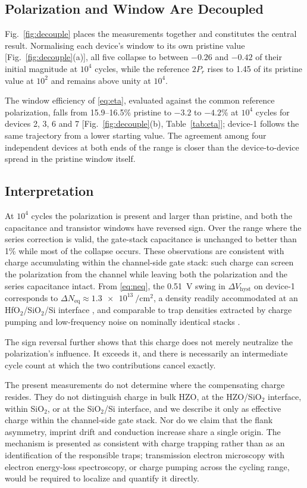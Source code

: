 \documentclass[journal]{IEEEtran}
\newcommand{\rev}[1]{#1}                    %
\newcommand{\Prem}{P_r}
\newcommand{\Neq}{N_{\mathrm{eq}}}
\newcommand{\dVh}{\Delta V_{\mathrm{hyst}}}
\begin{document}
\subsection{Polarization and Window Are Decoupled}
\rev{Fig.~\ref{fig:decouple} places the measurements together and
constitutes the central result. Normalising each device's window to its
own pristine value [Fig.~\ref{fig:decouple}(a)], all five collapse to
between $-0.26$ and $-0.42$ of their initial magnitude at $10^4$ cycles,
while the reference $2\Prem$ rises to 1.45 of its pristine value at
$10^2$ and remains above unity at $10^4$.

The window efficiency of \eqref{eq:eta}, evaluated against the common
reference polarization, falls from 15.9--16.5\% pristine to $-3.2$ to
$-4.2$\% at $10^4$ cycles for devices 2, 3, 6 and 7
[Fig.~\ref{fig:decouple}(b), Table~\ref{tab:eta}]; device-1 follows the
same trajectory from a lower starting value. The agreement among four
independent devices at both ends of the range is closer than the
device-to-device spread in the pristine window itself.}

\subsection{Interpretation}
\rev{At $10^4$ cycles the polarization is present and larger than
pristine, and both the capacitance and transistor windows have reversed
sign. Over the range where the series correction is valid, the
gate-stack capacitance is unchanged to better than 1\% while most of the
collapse occurs. These observations are consistent with charge
accumulating within the channel-side gate stack: such charge can screen
the polarization from the channel while leaving both the polarization
and the series capacitance intact.} From \eqref{eq:neq}, the
\SI{0.51}{\volt} swing in $\dVh$ on device-1 corresponds to
$\Delta\Neq\approx\SI{1.3e13}{\per\centi\meter\squared}$, a density
readily accommodated at an HfO$_2$/SiO$_2$/Si interface
\cite{Ref_DD_1,Toprasertpong}, and comparable to trap densities
extracted by charge pumping and low-frequency noise on nominally
identical stacks \cite{Trapping_dynamics,Defect_dynamics}.

The sign reversal further shows that this charge does not merely
neutralize the polarization's influence. It exceeds it, and there is
necessarily an intermediate cycle count at which the two contributions
cancel exactly.

\rev{The present measurements do not determine where the compensating
charge resides. They do not distinguish charge in bulk HZO, at the
HZO/SiO$_2$ interface, within SiO$_2$, or at the SiO$_2$/Si interface,
and we describe it only as effective charge within the channel-side gate
stack. Nor do we claim that the flank asymmetry, imprint drift and
conduction increase share a single origin. The mechanism is presented as
consistent with charge trapping rather than as an identification of the
responsible traps; transmission electron microscopy with electron
energy-loss spectroscopy, or charge pumping across the cycling range,
would be required to localize and quantify it directly.}
\end{document}
